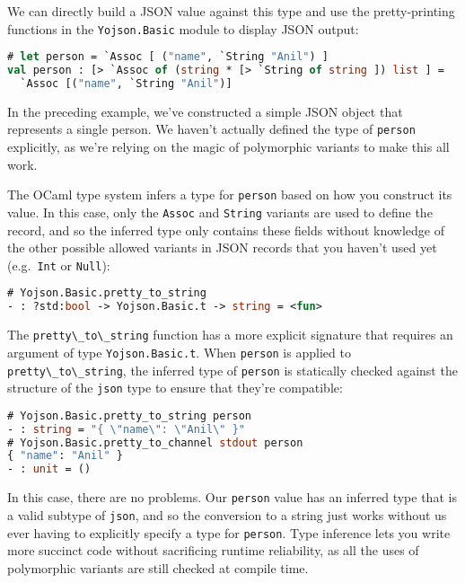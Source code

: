 We can directly build a JSON value against this type and use the
pretty-printing functions in the \passthrough{\lstinline!Yojson.Basic!}
module to display JSON output:

\begin{lstlisting}[language=Caml]
# let person = `Assoc [ ("name", `String "Anil") ]
val person : [> `Assoc of (string * [> `String of string ]) list ] =
  `Assoc [("name", `String "Anil")]
\end{lstlisting}

In the preceding example, we've constructed a simple JSON object that
represents a single person. We haven't actually defined the type of
\passthrough{\lstinline!person!} explicitly, as we're relying on the
magic of polymorphic variants to make this all work.

The OCaml type system infers a type for \passthrough{\lstinline!person!}
based on how you construct its value. In this case, only the
\passthrough{\lstinline!Assoc!} and \passthrough{\lstinline!String!}
variants are used to define the record, and so the inferred type only
contains these fields without knowledge of the other possible allowed
variants in JSON records that you haven't used yet
(e.g.~\passthrough{\lstinline!Int!} or \passthrough{\lstinline!Null!}):

\begin{lstlisting}[language=Caml]
# Yojson.Basic.pretty_to_string
- : ?std:bool -> Yojson.Basic.t -> string = <fun>
\end{lstlisting}

The \passthrough{\lstinline!pretty\_to\_string!} function has a more
explicit signature that requires an argument of type
\passthrough{\lstinline!Yojson.Basic.t!}. When
\passthrough{\lstinline!person!} is applied to
\passthrough{\lstinline!pretty\_to\_string!}, the inferred type of
\passthrough{\lstinline!person!} is statically checked against the
structure of the \passthrough{\lstinline!json!} type to ensure that
they're compatible:

\begin{lstlisting}[language=Caml]
# Yojson.Basic.pretty_to_string person
- : string = "{ \"name\": \"Anil\" }"
# Yojson.Basic.pretty_to_channel stdout person
{ "name": "Anil" }
- : unit = ()
\end{lstlisting}

In this case, there are no problems. Our
\passthrough{\lstinline!person!} value has an inferred type that is a
valid subtype of \passthrough{\lstinline!json!}, and so the conversion
to a string just works without us ever having to explicitly specify a
type for \passthrough{\lstinline!person!}. Type inference lets you write
more succinct code without sacrificing runtime reliability, as all the
uses of polymorphic variants are still checked at compile time.


